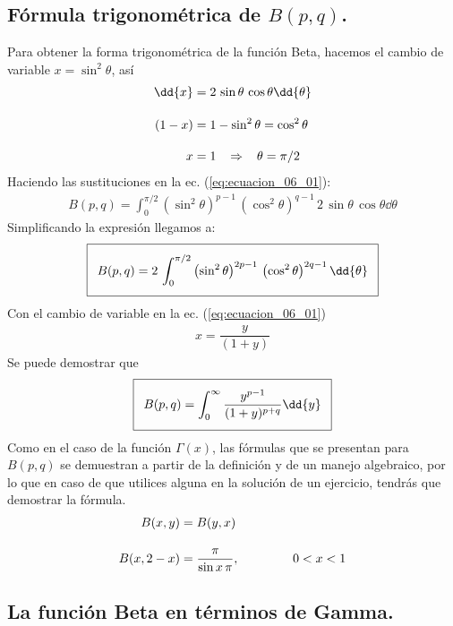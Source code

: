 \subsection{Fórmula trigonométrica de \texorpdfstring{$B(p,q)$}{B(p, q)}.}

Para obtener la forma trigonométrica de la función Beta, hacemos el cambio de variable $x = \sin^{2} \theta$, así
\begin{align*}
\dd{x} &= 2 \, \sin \theta \, \cos \theta \dd{\theta} \\[1em]
(1 - x) &= 1 - \sin^{2} \theta = \cos^{2} \theta \\[1em]
x &= 1 \hspace{0.3cm} \Rightarrow \hspace{0.3cm} \theta = \pi/2
\end{align*}
Haciendo las sustituciones en la ec. (\ref{eq:ecuacion_06_01}):
{\fontsize{12}{12}\selectfont
\begin{align}
B(p, q) = \int_{0}^{\pi/2} \left( \sin^{2} \theta \right)^{p-1} \, \left( \cos^{2} \theta \right)^{q-1} \, 2 \, \sin \theta \, \cos \theta \dd{\theta}
\end{align}}
Simplificando la expresión llegamos a:
{\fontsize{12}{12}\selectfont
\begin{align}
\addtolength{\fboxsep}{5pt}\boxed{B(p, q) = 2 \, \int_{0}^{\pi/2} \left( \sin^{2} \theta \right)^{2p-1} \, \left( \cos^{2} \theta \right)^{2q-1} \dd{\theta}}
\label{eq:ecuacion_06_04}
\end{align}}
Con el cambio de variable en la ec. (\ref{eq:ecuacion_06_01})
\begin{align*}
x = \dfrac{y}{(1 + y)}
\end{align*}
Se puede demostrar que
\begin{align}
\addtolength{\fboxsep}{5pt}\boxed{B(p, q) = \int_{0}^{\infty} \dfrac{y^{p-1}}{(1 + y)^{p+q}} \dd{y}}
\label{eq:ecuacion_06_05}
\end{align}   
Como en el caso de la función $\Gamma (x)$, las fórmulas que se presentan para $B(p, q)$ se demuestran a partir de la definición y de un manejo algebraico, por lo que en caso de que utilices alguna en la solución de un ejercicio, tendrás que demostrar la fórmula.
\begin{align*}
B (x, y) &= B (y, x) \\[1em]
B (x, 2-x) &= \dfrac{\pi}{\sin x \, \pi}, \hspace{1.5cm} 0 < x < 1   
\end{align*}

\subsection{La función Beta en términos de Gamma.}


